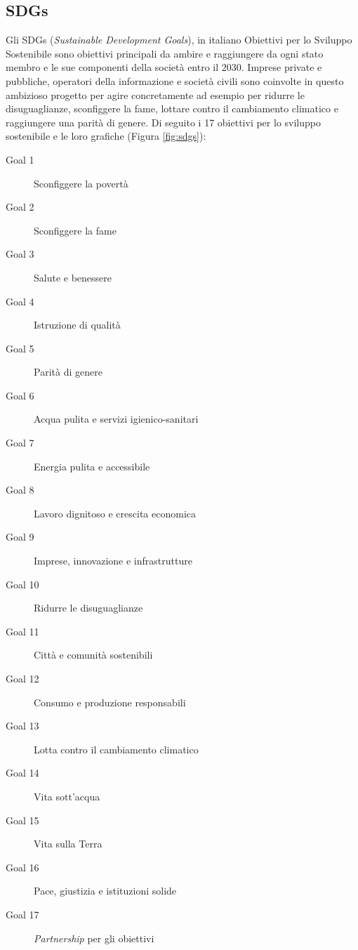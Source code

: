 \subsection{SDGs}
\label{sec:sdgs}
Gli SDGs (\textit{Sustainable Development Goals})\cite{agenda2030}, in italiano Obiettivi per lo Sviluppo Sostenibile sono obiettivi principali da ambire e raggiungere da ogni stato membro e le sue componenti della società entro il 2030. Imprese private e pubbliche, operatori della informazione e società civili sono coinvolte in questo ambizioso progetto per agire concretamente ad esempio per ridurre le disuguaglianze, sconfiggere la fame, lottare contro il cambiamento climatico e raggiungere una parità di genere.
Di seguito i 17 obiettivi per lo sviluppo sostenibile e le loro grafiche (Figura \ref{fig:sdgs}):
\begin{description}
    \item[Goal 1] Sconfiggere la povertà
    \item[Goal 2] Sconfiggere la fame
    \item[Goal 3] Salute e benessere
    \item[Goal 4] Istruzione di qualità
    \item[Goal 5] Parità di genere
    \item[Goal 6] Acqua pulita e servizi igienico-sanitari
    \item[Goal 7]  Energia pulita e accessibile
    \item[Goal 8] Lavoro dignitoso e crescita economica
    \item[Goal 9]  Imprese, innovazione e infrastrutture
    \item[Goal 10] Ridurre le disuguaglianze
    \item[Goal 11] Città e comunità sostenibili
    \item[Goal 12] Consumo e produzione responsabili
    \item[Goal 13] Lotta contro il cambiamento climatico
    \item[Goal 14] Vita sott’acqua
    \item[Goal 15] Vita sulla Terra
    \item[Goal 16] Pace, giustizia e istituzioni solide
    \item[Goal 17] \textit{Partnership} per gli obiettivi
\end{description}
%
